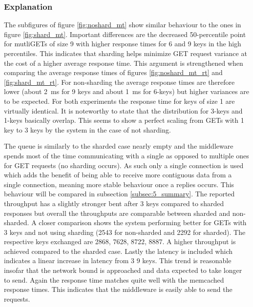         \subsubsection{Explanation\label{subsubsec:5_nonsharded_summary}}

            The subfigures of figure \ref{fig:noshard_mt} show similar behaviour to the ones in figure
            \ref{fig:shard_mt}. Important differences are the decreased 50-percentile point for mutliGETs of size 9
            with higher response times for 6 and 9 keys in the high percentiles. This indicates that sharding helps
            minimize GET request variance at the cost of a higher average response time. This argument is strengthened
            when comparing the average response times of figures \ref{fig:noshard_mt_rt} and \ref{fig:shard_mt_rt}. For
            non-sharding the average response times are therefore lower (about \SI{2}{\milli\second} for 9 keys and
            about \SI{1}{\milli\second} for 6-keys) but higher variances are to be expected. For both experiments the
            response time for keys of size 1 are virtually identical. It is noteworthy to state that the distribution
            for 3-keys and 1-keys basically overlap. This seems to show a perfect scaling from GETs with 1 key to 3 keys
            by the system in the case of not sharding.


            The queue is similarly to the sharded case nearly empty and the middleware spends most of the time
            communicating with a single \srv{} as opposed to multiple ones for GET requests (no sharding occurs). As
            such only a single connection is used which adds the benefit of being able to receive more contiguous data
            from a single connection, meaning more stable behaviour once a replies occurs. This behaviour will be
            compared in subsection \ref{subsec:5_summary}.\newline
            The reported throughput has a slightly stronger bent after 3 keys compared to sharded responses but overall
            the throughputs are comparable between sharded and non-sharded. A closer comparison shows the system
            performing better for GETs with 3 keys and not using sharding (2543 for non-sharded and 2292 for
            sharded). The respective keys exchanged are 2868, 7628, 8722, 8887. A higher throughput is achieved compared
            to the sharded case. Lastly the latency is included which indicates a linear increase in latency from 3
            \textendash{} 9 keys. This trend is reasonable insofar that the network bound is approached and data
            expected to take longer to send.
            Again the response time matches quite well with the memcached response times. This indicates that the
            middleware is easily able to send the requests.


